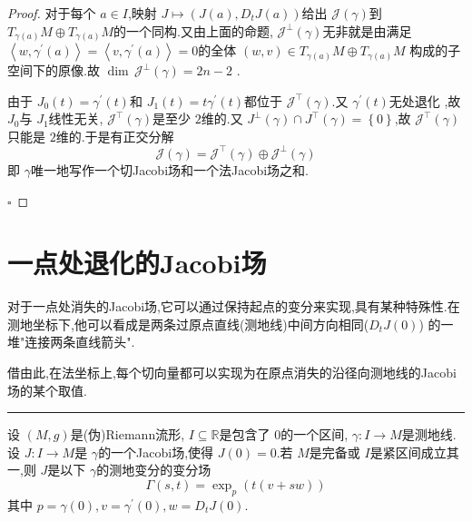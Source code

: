 \documentclass[../../几何与拓扑.tex]{subfiles}
\begin{document}
\begin{proof}
    对于每个 \(  a \in I  \),映射 \(  J\mapsto \left( J\left( a \right),D_{t}J\left( a \right)   \right)   \)给出 \(  \mathscr{J}\left(  \gamma  \right)   \)到 \(  T_{ \gamma \left( a \right) }M\oplus T_{ \gamma \left( a \right) }M  \)的一个同构.又由上面的命题, \(  \mathscr{J}^{\perp}\left(  \gamma  \right)   \)无非就是由满足 \(  \left<w, \gamma ^{\prime} \left( a \right)  \right> = \left<v, \gamma ^{\prime} \left( a \right)  \right> = 0  \)的全体 \(  \left( w,v \right) \in T_{ \gamma \left( a \right) }M\oplus T_{ \gamma \left( a \right) }M   \)  构成的子空间下的原像.故 \(  \operatorname{dim}\,\mathscr{J}^{\perp}\left(  \gamma  \right)= 2n-2   \)      .

    由于 \(  J_0\left( t \right)=  \gamma ^{\prime} \left( t \right)    \)和 \(  J_1\left( t \right)= t \gamma ^{\prime} \left( t \right)    \)都位于 \(  \mathscr{J}^{\top}\left(  \gamma  \right)   \).又 \(   \gamma ^{\prime} \left( t \right)   \)无处退化    ,故 \(  J_0  \)与 \(  J_1  \)线性无关, \(  \mathscr{J}^{\top}\left(  \gamma  \right)   \)是至少 \(  2  \)维的.又 \(  J^{\perp}\left(  \gamma  \right)\cap J^{\top}\left(  \gamma  \right)= \left\{ 0 \right\}    \),故 \(  \mathscr{J}^{\top}\left(  \gamma  \right)   \)只能是 \(  2  \)维的.于是有正交分解 \[
    \mathscr{J}\left(  \gamma  \right)= \mathscr{J}^{\top}\left(  \gamma  \right)\oplus \mathscr{J}^{\perp}\left(  \gamma  \right)   
    \]       即 \(   \gamma   \)唯一地写作一个切Jacobi场和一个法Jacobi场之和. 

    \hfill $\square$
\end{proof}

\section{一点处退化的Jacobi场}


对于一点处消失的Jacobi场,它可以通过保持起点的变分来实现,具有某种特殊性.在测地坐标下,他可以看成是两条过原点直线(测地线)中间方向相同(\(  D_{t}J\left( 0 \right)   \)) 的一堆"连接两条直线箭头".

借由此,在法坐标上,每个切向量都可以实现为在原点消失的沿径向测地线的Jacobi场的某个取值.



\hspace*{\fill} 
\hrule
\hspace*{\fill}


\begin{lemma}
    设 \(  \left( M,g \right)   \)是(伪)Riemann流形, \(  I\subseteq \mathbb{R}   \)是包含了 \(  0  \)的一个区间, \(   \gamma :I\to M  \)是测地线.设 \(  J:I\to M  \)是 \(   \gamma   \)的一个Jacobi场,使得 \(  J\left( 0 \right)= 0   \).若 \(  M  \)是完备或 \(  I  \)是紧区间成立其一,则 \(  J  \)是以下 \(   \gamma   \)的测地变分的变分场 \[
     \Gamma \left( s,t \right)= \exp _{p}\left( t\left( v+ sw \right)  \right)  
    \]其中 \(  p=  \gamma \left( 0 \right), v=  \gamma ^{\prime} \left( 0 \right)    , w = D_{t}J\left( 0 \right) \).            
\end{lemma}
\end{document}
